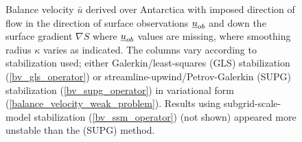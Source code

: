 \begin{figure}
  \caption[Antarctica balance-velocity with $\mathbf{d}^{\text{data}} = -\nabla S$ where $\mathbf{u}_{ob}$ are missing.]{Balance velocity $\bar{u}$ derived over Antarctica with imposed direction of flow in the direction of surface observations $\underline{u}_{ob}$ and down the surface gradient $\nabla S$ where $\underline{u}_{ob}$ values are missing, where smoothing radius $\kappa$ varies as indicated.  The columns vary according to stabilization used; either Galerkin/least-squares (GLS) stabilization (\ref{bv_gls_operator}) or streamline-upwind/Petrov-Galerkin (SUPG) stabilization (\ref{bv_supg_operator}) in variational form (\ref{balance_velocity_weak_problem}).  Results using subgrid-scale-model stabilization (\ref{bv_ssm_operator}) (not shown) appeared more unstable than the (SUPG) method. \newline}
  
  \label{antarctica_bv_image_d_gS_m_U}
  
\end{figure}



